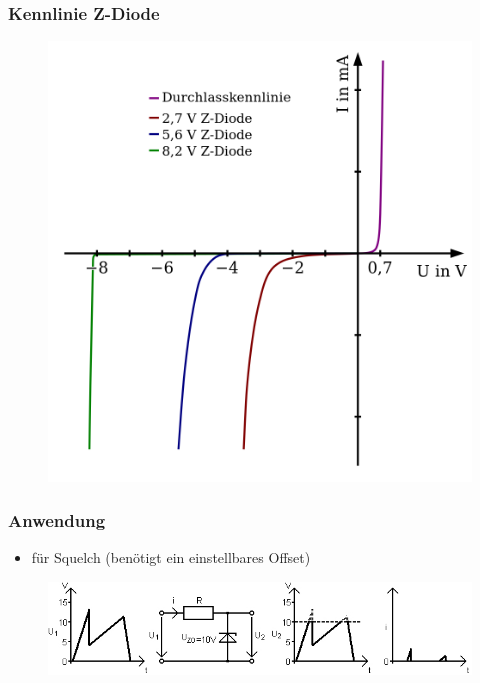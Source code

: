 \begin{frame}
  \frametitle{Kennlinie Z-Diode}
  \begin{center}
    \begin{figure}
      \includegraphics[height=.8\textheight,height=.75\textheight,keepaspectratio]{e12/Kennlinie_Z-Diode.png}
    \end{figure}
  \end{center}
\end{frame}

\begin{frame}
  \frametitle{Anwendung}
  \begin{itemize}
    \item für Squelch (benötigt ein einstellbares Offset)
  \end{itemize}
  \begin{center}
    \begin{figure}
      \includegraphics[width=\textwidth,height=.7\textheight,keepaspectratio]{e12/U-Stab-Z-Diode.jpg}
    \end{figure}
  \end{center}
\end{frame}

